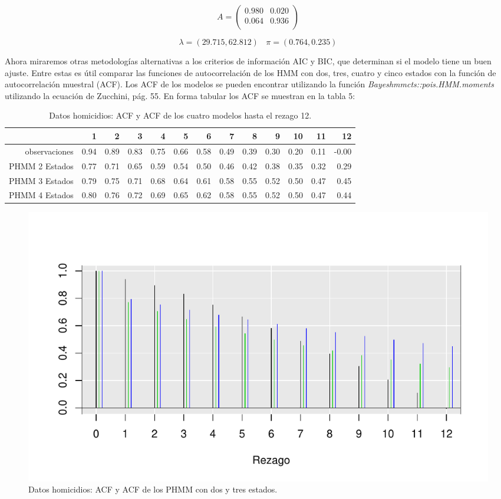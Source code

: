 \documentclass[a4paper]{article}\usepackage[]{graphicx}\usepackage[]{color}
\makeatletter
\def\maxwidth{ %
  \ifdim\Gin@nat@width>\linewidth
    \linewidth
  \else
    \Gin@nat@width
  \fi
}
\newenvironment{knitrout}{}{} %
\makeatother
\begin{document}
$$
A = \begin{pmatrix}{}
  0.980 & 0.020 \\ 
  0.064 & 0.936 \\ 
\end{pmatrix}
$$

$$\lambda = (29.715, 62.812) \ \ \ \ \pi = (0.764, 0.235)$$

Ahora miraremos otras metodologías alternativas a los criterios de información AIC y BIC, que determinan si el modelo tiene un buen ajuste. Entre estas es útil comparar las funciones de autocorrelación de los HMM con dos, tres, cuatro y cinco estados con la función de autocorrelación muestral (ACF). Los ACF de los modelos se pueden encontrar utilizando la función \emph{Bayeshmmcts::pois.HMM.moments} utilizando la ecuación de Zucchini, pág. 55. En forma tabular los ACF se muestran en la tabla 5:

\begin{table}[ht]
\centering
\begin{tabular}{rrrrrrrrrrrrr}
  \hline
 & 1 & 2 & 3 & 4 & 5 & 6 & 7 & 8 & 9 & 10 & 11 & 12 \\ 
  \hline
observaciones & 0.94 & 0.89 & 0.83 & 0.75 & 0.66 & 0.58 & 0.49 & 0.39 & 0.30 & 0.20 & 0.11 & -0.00 \\ 
  PHMM 2 Estados & 0.77 & 0.71 & 0.65 & 0.59 & 0.54 & 0.50 & 0.46 & 0.42 & 0.38 & 0.35 & 0.32 & 0.29 \\ 
  PHMM 3 Estados & 0.79 & 0.75 & 0.71 & 0.68 & 0.64 & 0.61 & 0.58 & 0.55 & 0.52 & 0.50 & 0.47 & 0.45 \\ 
  PHMM 4 Estados & 0.80 & 0.76 & 0.72 & 0.69 & 0.65 & 0.62 & 0.58 & 0.55 & 0.52 & 0.50 & 0.47 & 0.44 \\ 
   \hline
\end{tabular}
\caption{Datos homicidios: ACF y ACF de los cuatro modelos hasta el rezago 12.} 
\end{table}


\begin{knitrout}
\color{fgcolor}\begin{figure}[h]
\includegraphics[width=\maxwidth]{figure/unnamed-chunk-15-1} \caption[Datos homicidios]{Datos homicidios: ACF y ACF de los PHMM con dos y tres estados.}\label{fig:unnamed-chunk-15}
\end{figure}


\end{knitrout}
\end{document}

